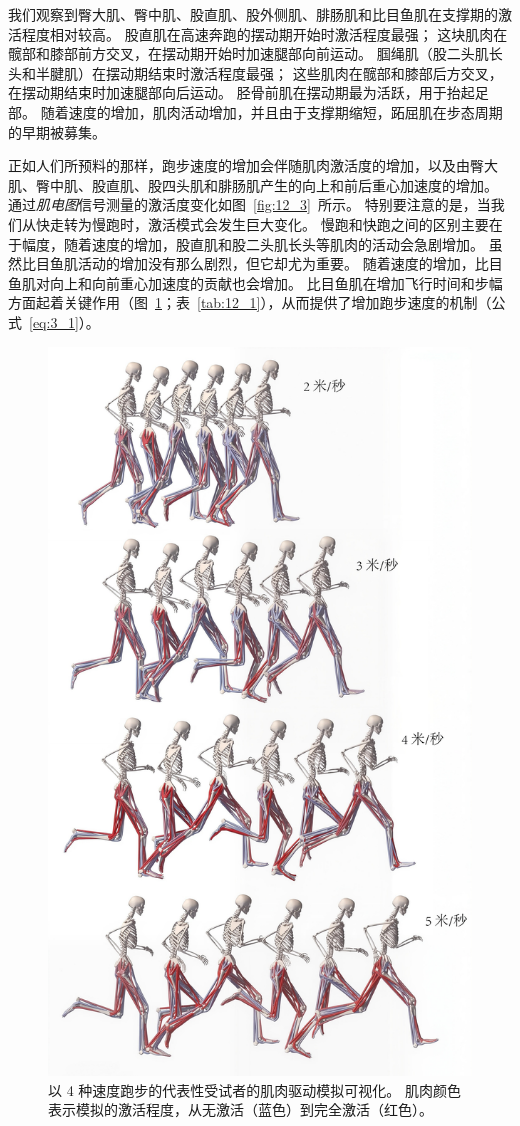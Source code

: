 我们观察到臀大肌、臀中肌、股直肌、股外侧肌、腓肠肌和比目鱼肌在支撑期的激活程度相对较高。
股直肌在高速奔跑的摆动期开始时激活程度最强；
这块肌肉在髋部和膝部前方交叉，在摆动期开始时加速腿部向前运动。
腘绳肌（股二头肌长头和半腱肌）在摆动期结束时激活程度最强；
这些肌肉在髋部和膝部后方交叉，在摆动期结束时加速腿部向后运动。
胫骨前肌在摆动期最为活跃，用于抬起足部。
随着速度的增加，肌肉活动增加，并且由于支撑期缩短，跖屈肌在步态周期的早期被募集。


正如人们所预料的那样，跑步速度的增加会伴随肌肉激活度的增加，以及由臀大肌、臀中肌、股直肌、股四头肌和腓肠肌产生的向上和前后重心加速度的增加。
通过\textit{肌电图}信号测量的激活度变化如图~\ref{fig:12_3}~所示。
特别要注意的是，当我们从快走转为慢跑时，激活模式会发生巨大变化。
慢跑和快跑之间的区别主要在于幅度，随着速度的增加，股直肌和股二头肌长头等肌肉的活动会急剧增加。
虽然比目鱼肌活动的增加没有那么剧烈，但它却尤为重要。
随着速度的增加，比目鱼肌对向上和向前重心加速度的贡献也会增加。
比目鱼肌在增加飞行​​时间和步幅方面起着关键作用（图~\ref{fig:12_4}；表~\ref{tab:12_1}），从而提供了增加跑步速度的机制（公式~\ref{eq:3_1}）。

\begin{figure}[!htb]
	\centering
	\includegraphics[width=0.8\linewidth]{chap12/12_4}
	\caption{以 4 种速度跑步的代表性受试者的肌肉驱动模拟可视化。
		肌肉颜色表示模拟的激活程度，从无激活（蓝色）到完全激活（红色）\cite{arnold2013muscle}。 \label{fig:12_4}}
\end{figure}


